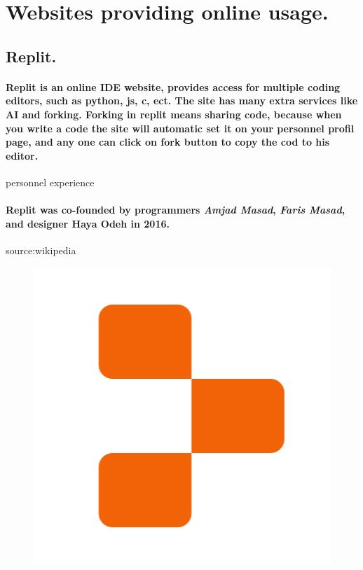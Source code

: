 \documentclass[a4paper,11pt]{report}
\begin{document}
\clearpage

\section{Websites providing online usage.}
\subsection{Replit.}

\paragraph{Replit is an online IDE website, provides access for multiple coding editors, such as python, js, c, ect. The site has many extra services like AI and forking. Forking in replit means sharing code, because when you write a code the site will automatic set it on your personnel profil page, and any one can click on fork button to copy the cod to his editor.}personnel experience
\paragraph{Replit was co-founded by programmers \textit{Amjad Masad}, \textit{Faris Masad}, and designer Haya Odeh in 2016.}source:wikipedia
\begin{figure}[!h]
    \centering
    \includegraphics[scale=0.1]{img13.png}
    
\end{figure}
\end{document}
